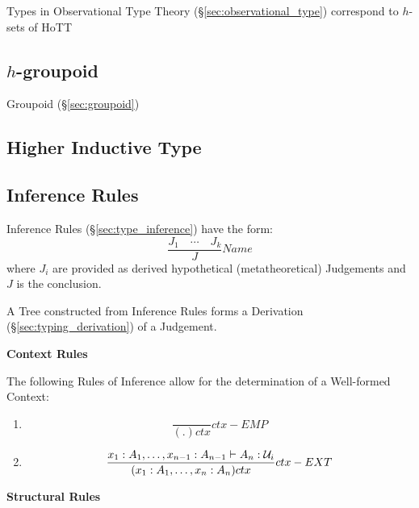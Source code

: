Types in Observational Type Theory (\S\ref{sec:observational_type})
correspond to $h$-sets of HoTT



\subsection{$h$-groupoid}\label{sec:h_groupoid}

Groupoid (\S\ref{sec:groupoid})



\subsection{Higher Inductive Type}\label{sec:higher_inductive_type}

\subsection{Inference Rules}\label{sec:homotopy_rules}

Inference Rules (\S\ref{sec:type_inference}) have the form:
\[
  \frac{J_1 \quad \cdots \quad J_k} {J} Name
\]
where $J_i$ are provided as derived hypothetical (metatheoretical)
Judgements and $J$ is the conclusion.

A Tree constructed from Inference Rules forms a Derivation
(\S\ref{sec:typing_derivation}) of a Judgement.



\textbf{Context Rules}

The following Rules of Inference allow for the determination of a
Well-formed Context:
\begin{enumerate}
\item
\[
  {
    \frac{}{(.)ctx}
  } ctx-EMP
\]
\item
\[
  {
    \frac
    {x_1:A_1, \ldots, x_{n-1}:A_{n-1} \vdash A_n : \mathcal{U}_i}
    {(x_1:A_1,\ldots,x_n:A_n) ctx}
  } ctx-EXT
\]
\end{enumerate}



\textbf{Structural Rules}

